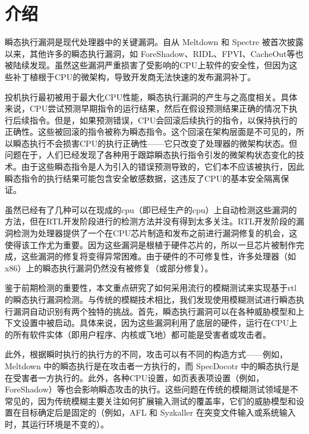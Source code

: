 \section{介绍}

瞬态执行漏洞是现代处理器中的关键漏洞。自从 Meltdown 和 Spectre 被首次披露以来，其他许多的瞬态执行漏洞，如 ForeShadow、RIDL、FPVI、CacheOut等也被陆续发现。虽然这些漏洞严重损害了受影响的CPU上软件的安全性，但因为这些补丁植根于CPU的微架构，导致开发商无法快速的发布漏洞补丁。\par

投机执行最初被用于最大化CPU性能，瞬态执行漏洞的产生与之高度相关。具体来说，CPU尝试预测早期指令的运行结果，然后在假设预测结果正确的情况下执行后续指令。但是，如果预测错误，CPU会回滚后续执行的指令，以保持执行的正确性。这些被回滚的指令被称为瞬态指令。这个回滚在架构层面是不可见的，所以瞬态执行不会损害CPU的执行正确性——它只改变了处理器的微架构状态。但问题在于，人们已经发现了各种用于跟踪瞬态执行指令引发的微架构状态变化的技术。由于这些瞬态指令是人为引入的错误预测导致的，它们本不应该被执行，因此瞬态指令的执行结果可能包含安全敏感数据，这违反了CPU的基本安全隔离保证。\par

虽然已经有了几种可以在现成的cpu（即已经生产的cpu）上自动检测这些漏洞的方法，但在RTL开发阶段进行的检测方法并没有得到太多关注。RTL开发阶段的漏洞检测为处理器提供了一个在CPU芯片制造和发布之前进行漏洞修复的机会，这使得该工作尤为重要。因为这些漏洞是根植于硬件芯片的，所以一旦芯片被制作完成，这些漏洞的修复将变得异常困难。由于硬件的不可修复性，许多处理器（如 x86）上的瞬态执行漏洞仍然没有被修复（或部分修复）。\par

鉴于前期检测的重要性，本文重点研究了如何采用流行的模糊测试来实现基于rtl的瞬态执行漏洞检测。与传统的模糊技术相比，我们发现使用模糊测试进行瞬态执行漏洞自动识别有两个独特的挑战。首先，瞬态执行漏洞可以在各种威胁模型和上下文设置中被启动。具体来说，因为这些漏洞利用了底层的硬件，运行在CPU上的所有软件实体（即用户程序、内核或飞地）都可能是受害者或攻击者。\par

此外，根据瞬时执行的执行方的不同，攻击可以有不同的构造方式——例如，Meltdown 中的瞬态执行是在攻击者一方执行的，而 SpecDocotr 中的瞬态执行是在受害者一方执行的。此外，各种CPU设置，如页表表项设置（例如，ForeShadow）等也会影响瞬态攻击的执行。这些问题在传统的模糊测试领域是不常见的，因为传统模糊主要关注如何扩展输入测试的覆盖率，它们的威胁模型和设置在目标确定后是固定的（例如，AFL 和  Syzkaller 在突变文件输入或系统输入时，其运行环境是不变的）。\par

